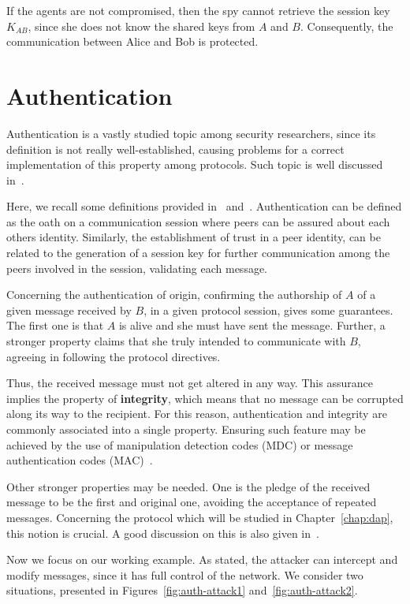 If the agents are not compromised, then the spy cannot retrieve the session key \(K_{AB}\), since she does not know the shared keys from \(A\) and \(B\). Consequently, the communication between Alice and Bob is protected.





\section{Authentication}\label{sec:protocols:auth}
Authentication is a vastly studied topic among security researchers, since its definition is not really well-established, causing problems for a correct implementation of this property among protocols. Such topic is well discussed in~\cite{Gollmann2000}.

Here, we recall some definitions provided in~\cite{Diffie92} and~\cite{RyanSchneider2010}. Authentication can be defined as the oath on a communication session where peers can be assured about each others identity. Similarly, the establishment of trust in a peer identity, can be related to the generation of a session key for further communication among the peers involved in the session, validating each message.

Concerning the authentication of origin, confirming the authorship of \(A\) of a given message received by \(B\), in a given protocol session, gives some guarantees. The first one is that \(A\) is alive and she must have sent the message. Further, a stronger property claims that she truly intended to communicate with \(B\), agreeing in following the protocol directives.

Thus, the received message must not get altered in any way. This assurance implies the property of \textbf{integrity}, which means that no message can be corrupted along its way to the recipient. For this reason, authentication and integrity are commonly associated into a single property. Ensuring such feature may be achieved by the use of manipulation detection codes (MDC) or message authentication codes (MAC)~\cite{ross-security}.

Other stronger properties may be needed. One is the pledge of the received message to be the first and original one, avoiding the acceptance of repeated messages. Concerning the protocol which will be studied in Chapter~\ref{chap:dap}, this notion is crucial. A good discussion on this is also given in~\cite{Gollmann2000}.

Now we focus on our working example. As stated, the attacker can intercept and modify messages, since it has full control of the network. We consider two situations, presented in Figures~\ref{fig:auth-attack1} and~\ref{fig:auth-attack2}.

